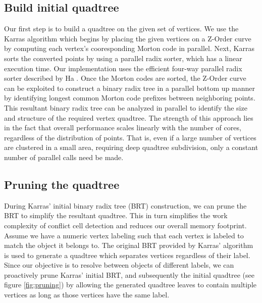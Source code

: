 \documentclass[final,3p,times,twocolumn]{elsarticle}
\begin{document}
\subsection{Build initial quadtree}
\label{sec:build-initial-quadtree}
Our first step is to build a quadtree on the given set of vertices. We use the Karras algorithm \cite{karras2012maximizing} which begins by placing the given vertices on a Z-Order curve by computing each vertex's cooresponding Morton code in parallel. Next, Karras sorts the converted points by using a parallel radix sorter, which has a linear execution time. Our implementation uses the efficient four-way parallel radix sorter described by Ha \etal {}. Once the Morton codes are sorted, the Z-Order curve can be exploited to construct a binary radix tree in a parallel bottom up manner by identifying longest common Morton code prefixes between neighboring points. This resultant binary radix tree can be analyzed in parallel to identify the size and structure of the required vertex quadtree. The strength of this approach lies in the fact that overall performance scales linearly with the number of cores, regardless of the distribution of points. That is, even if a large number of vertices are clustered in a small area, requiring deep quadtree subdivision, only a constant number of parallel calls need be made.


\subsection{Pruning the quadtree}
\label{sec:pruning}
During Karras' initial binary radix tree (BRT) construction, we can prune the BRT to simplify the resultant quadtree. This in turn simplifies the work complexity of conflict cell detection and reduces our overall memory footprint. Assume we have a numeric vertex labeling such that each vertex is labeled to match the object it belongs to. The original BRT provided by Karras' algorithm is used to generate a quadtree which separates vertices regardless of their label. Since our objective is to resolve between objects of different labels, we can proactively prune Karras' initial BRT, and subsequently the initial quadtree (see figure \ref{fig:pruning}) by allowing the generated quadtree leaves to contain multiple vertices as long as those vertices have the same label.
\end{document}
